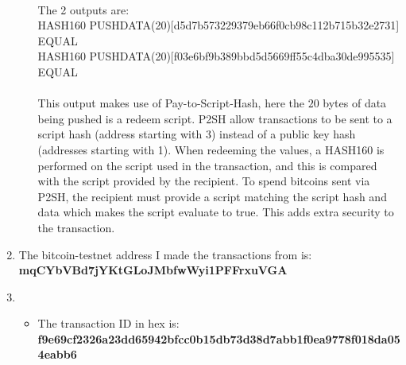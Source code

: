 \documentclass[12pt, a4paper]{article}
\begin{document}
\begin{enumerate}
\begin{enumerate}
\\
The 2 outputs are:
\\
\phantom{ab} HASH160 PUSHDATA(20)[d5d7b573229379eb66f0cb98c112b715b32e2731] EQUAL\\
\phantom{ab} HASH160 PUSHDATA(20)[f03e6bf9b389bbd5d5669ff55c4dba30de995535] EQUAL\\
\\
This output makes use of Pay-to-Script-Hash, here the $20$ bytes of data being pushed is a redeem script. P2SH allow transactions to be sent to a script hash (address starting with 3) instead of a public key hash (addresses starting with 1). When redeeming the values, a HASH160 is performed on the script used in the transaction, and this is compared with the script provided by the recipient. To spend bitcoins sent via P2SH, the recipient must provide a script matching the script hash and data which makes the script evaluate to true. This adds extra security to the transaction.
\end{enumerate}
\item The bitcoin-testnet address I made the transactions from is:\\
\phantom{ab}\textbf{mqCYbVBd7jYKtGLoJMbfwWyi1PFFrxuVGA}
\item \begin{itemize}
\renewcommand\labelitemi{\tiny$\bullet$}
\itemsep0em
\item The transaction ID in hex is:\\ \phantom{ab}\textbf{f9e69cf2326a23dd65942bfcc0b15db73d38d7abb1f0ea9778f018da054eabb6}


\end{itemize}
\end{enumerate}
\end{document}
